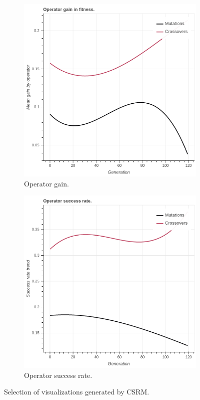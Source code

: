 \begin{figure}
\begin{subfigure}{0.5\textwidth}
    \centering
        \includegraphics[width=0.8\linewidth]{figures/viz_operatorgaintrend.png}
        \caption{Operator gain.}
    \end{subfigure}%
    \begin{subfigure}{0.5\textwidth}
    \centering
        \includegraphics[width=0.8\linewidth]{figures/viz_operatorsuccessratetrend.png}
        \caption{Operator success rate.}
    \end{subfigure}
    \caption{Selection of visualizations generated by CSRM.}
    \label{fig:viz}
\end{figure}

% 
